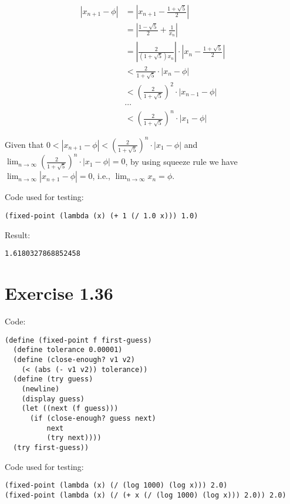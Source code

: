 \documentclass[../main.tex]{subfiles}
\begin{document}
\begin{align*}
|x_{n+1}-\phi| &= \left|x_{n+1}-\frac{1+\sqrt{5}}{2}\right| \\
&= \left|\frac{1-\sqrt{5}}{2}+\frac{1}{x_n}\right| \\
&= \left|\frac{2}{(1+\sqrt{5})x_n}\right|\cdot\left|x_n - \frac{1+\sqrt{5}}{2}\right| \\
&< \frac{2}{1+\sqrt{5}}\cdot|x_n - \phi| \\
&< \left(\frac{2}{1+\sqrt{5}}\right)^2\cdot|x_{n-1} - \phi| \\
&\cdots \\
&< \left(\frac{2}{1+\sqrt{5}}\right)^n\cdot|x_1 - \phi|
\end{align*}

Given that $0<|x_{n+1}-\phi|<\left(\frac{2}{1+\sqrt{5}}\right)^n\cdot|x_1 - \phi|$ and $\lim_{n\to\infty}\left(\frac{2}{1+\sqrt{5}}\right)^n\cdot|x_1 - \phi|=0$, by using squeeze rule we have $\lim_{n\to\infty}|x_{n+1}-\phi|=0$, i.e., $\lim_{n\to\infty}x_n=\phi$.

Code used for testing:

\begin{lstlisting}
(fixed-point (lambda (x) (+ 1 (/ 1.0 x))) 1.0)
\end{lstlisting}

Result:

\begin{lstlisting}
1.6180327868852458
\end{lstlisting}

\section{Exercise 1.36}

Code:

\begin{lstlisting}
(define (fixed-point f first-guess)
  (define tolerance 0.00001)
  (define (close-enough? v1 v2)
    (< (abs (- v1 v2)) tolerance))
  (define (try guess)
    (newline)
    (display guess)
    (let ((next (f guess)))
      (if (close-enough? guess next)
          next
          (try next))))
  (try first-guess))
\end{lstlisting}

Code used for testing:

\begin{lstlisting}
(fixed-point (lambda (x) (/ (log 1000) (log x))) 2.0)
(fixed-point (lambda (x) (/ (+ x (/ (log 1000) (log x))) 2.0)) 2.0)
\end{lstlisting}
\end{document}
